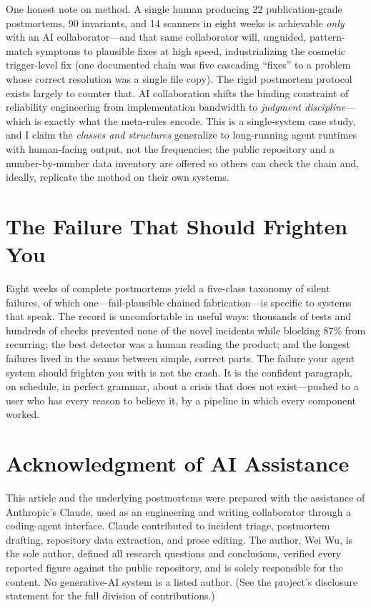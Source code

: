 \documentclass[10pt,journal]{IEEEtran}
\begin{document}
One honest note on method. A single human producing 22 publication-grade
postmortems, 90 invariants, and 14 scanners in eight weeks is achievable
\emph{only} with an AI collaborator---and that same collaborator will, unguided,
pattern-match symptoms to plausible fixes at high speed, industrializing the
cosmetic trigger-level fix (one documented chain was five cascading ``fixes'' to
a problem whose correct resolution was a single file copy). The rigid postmortem
protocol exists largely to counter that. AI collaboration shifts the binding
constraint of reliability engineering from implementation bandwidth to
\emph{judgment discipline}---which is exactly what the meta-rules encode. This
is a single-system case study, and I claim the \emph{classes and structures}
generalize to long-running agent runtimes with human-facing output, not the
frequencies; the public repository and a number-by-number data inventory are
offered so others can check the chain and, ideally, replicate the method on
their own systems.

\section{The Failure That Should Frighten You}
Eight weeks of complete postmortems yield a five-class taxonomy of silent
failures, of which one---fail-plausible chained fabrication---is specific to
systems that speak. The record is uncomfortable in useful ways: thousands of
tests and hundreds of checks prevented none of the novel incidents while
blocking 87\% from recurring; the best detector was a human reading the product;
and the longest failures lived in the seams between simple, correct parts. The
failure your agent system should frighten you with is not the crash. It is the
confident paragraph, on schedule, in perfect grammar, about a crisis that does
not exist---pushed to a user who has every reason to believe it, by a pipeline
in which every component worked.

\section*{Acknowledgment of AI Assistance}
This article and the underlying postmortems were prepared with the assistance
of Anthropic's Claude, used as an engineering and writing collaborator through
a coding-agent interface. Claude contributed to incident triage, postmortem
drafting, repository data extraction, and prose editing. The author, Wei Wu, is
the sole author, defined all research questions and conclusions, verified every
reported figure against the public repository, and is solely responsible for the
content. No generative-AI system is a listed author. (See the project's
disclosure statement for the full division of contributions.)
\end{document}
